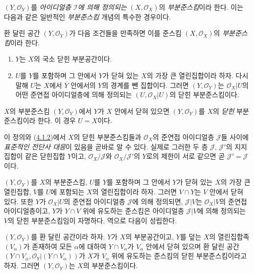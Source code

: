 $(Y,\mathscr{O}_Y)$를 \emph{아이디얼층 $\mathscr{I}$에 의해 정의되는}
$(X,\mathscr{O}_X)$의 \emph{부분준스킴}이라 한다. 이는 다음과 같은
일반적인 \emph{부분준스킴} 개념의 특수한 경우이다.

\begin{definition}[4.1.3]
\label{I.4.1.3-ko}
환 달린 공간 $(Y,\mathscr{O}_Y)$가 다음 조건들을 만족하면 이를
준스킴 $(X,\mathscr{O}_X)$의 \emph{부분준스킴}이라 한다.
\begin{enumerate}
  \item[$1^\circ$] $Y$는 $X$의 국소 닫힌 부분공간이다.
  \item[$2^\circ$] $U$를 $Y$를 포함하며 그 안에서 $Y$가 닫혀 있는
  $X$의 가장 큰 열린집합이라 하자. 다시 말해 $U$는 $X$에서
  $\overline{Y}$ 안에서의 $Y$의 경계를 뺀 집합이다. 그러면
  $(Y,\mathscr{O}_Y)$는 $\mathscr{O}_X|U$의 어떤 준연접 아이디얼층에
  의해 정의되는 $(U,\mathscr{O}_X|U)$의 닫힌 부분준스킴이다.
\end{enumerate}
$X$의 부분준스킴 $(Y,\mathscr{O}_Y)$에서 $Y$가 $X$ 안에서 닫혀
있으면 $(Y,\mathscr{O}_Y)$를 $X$의 \emph{닫힌} 부분준스킴이라 한다.
이 경우 $U=X$이다.
\end{definition}

이 정의와 (\hyperref[I.4.1.2-ko]{4.1.2})에서 $X$의 닫힌
부분준스킴들과 $\mathscr{O}_X$의 준연접 아이디얼층
$\mathscr{J}$들 사이에 \emph{표준적인 전단사 대응}이 있음을 곧바로
알 수 있다. 실제로 그러한 두 층 $\mathscr{J}$, $\mathscr{J}'$의
지지집합이 같은 닫힌집합 $Y$이고, $\mathscr{O}_X/\mathscr{J}$와
$\mathscr{O}_X/\mathscr{J}'$의 $Y$로의 제한이 서로 같으면 곧
$\mathscr{J}'=\mathscr{J}$이다.

\begin{env}[4.1.4]
\label{I.4.1.4-ko}
$(Y,\mathscr{O}_Y)$를 $X$의 부분준스킴, $U$를 $Y$를 포함하며 그
안에서 $Y$가 닫혀 있는 $X$의 가장 큰 열린집합, $V$를 $U$에
포함되는 $X$의 열린집합이라 하자. 그러면 $V\cap Y$는 $V$ 안에서
닫혀 있다. 또한 $Y$가 $\mathscr{O}_X|U$의 준연접 아이디얼층
$\mathscr{J}$에 의해 정의되면, $\mathscr{J}|V$는
$\mathscr{O}_X|V$의 준연접 아이디얼층이고, $Y$가 $Y\cap V$ 위에
유도하는 준스킴은 아이디얼층 $\mathscr{J}|V$에 의해 정의되는
$V$의 닫힌 부분준스킴임이 자명하다. 역으로 다음이 성립한다.
\end{env}

\begin{proposition}[4.1.5]
\label{I.4.1.5-ko}
$(Y,\mathscr{O}_Y)$를 환 달린 공간이라 하자. $Y$가 $X$의 부분공간이고,
$Y$를 덮는 $X$의 열린집합족 $(V_\alpha)$가 존재하여 모든
$\alpha$에 대하여 $Y\cap V_\alpha$가 $V_\alpha$ 안에서 닫혀 있으며
환 달린 공간
$(Y\cap V_\alpha,\mathscr{O}_Y|(Y\cap V_\alpha))$가 $X$가
$V_\alpha$ 위에 유도하는 준스킴의 닫힌 부분준스킴이라고 하자.
그러면 $(Y,\mathscr{O}_Y)$는 $X$의 부분준스킴이다.
\end{proposition}

